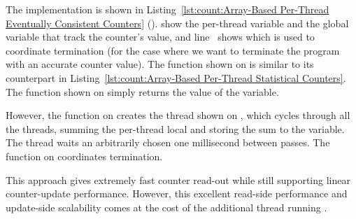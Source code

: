 \begin{lineref}
The implementation is shown in
Listing~\ref{lst:count:Array-Based Per-Thread Eventually Consistent Counters}
().
show the per-thread variable and the global variable that
track the counter's value, and line~ shows 
which is used to coordinate termination (for the case where we want
to terminate the program with an accurate counter value).
The  function shown on
 is similar to its
counterpart in
Listing~\ref{lst:count:Array-Based Per-Thread Statistical Counters}.
The  function shown on
 simply returns the
value of the  variable.

However, the  function on
creates the  thread shown on
, which
cycles through all the threads,
summing the per-thread local  and storing the
sum to the  variable.
The  thread waits an arbitrarily chosen one millisecond
between passes.
The  function on
 coordinates termination.

This approach gives extremely fast counter read-out while still
supporting linear counter-update performance.
However, this excellent read-side performance and update-side scalability
comes at the cost of the additional thread running .
\end{lineref}

